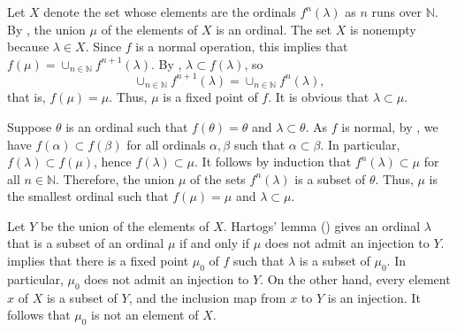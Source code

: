 \documentclass{article}
\begin{document}
\begin{solution}[\ref{exe:vxxp03js}]
  \label{sol:kcmslkfv}
  Let \(X\) denote the set whose elements are the ordinals
  \(f^n(\lambda)\) as \(n\) runs over \(\mathbb{N}\).  By
  , the union \(\mu\) of the elements of \(X\) is
  an ordinal.  The set \(X\) is nonempty because \(\lambda \in X\).
  Since \(f\) is a normal operation, this implies that
  \(f(\mu) = \cup_{n \in \mathbb{N}} f^{n+1}(\lambda)\).  By
  , \(\lambda \subset f(\lambda)\), so
  \begin{displaymath}
    \cup_{n \in \mathbb{N}} f^{n+1}(\lambda) =
    \cup_{n \in \mathbb{N}} f^n(\lambda),
  \end{displaymath}
  that is, \(f(\mu) = \mu\).  Thus, \(\mu\) is a fixed point of \(f\).
  It is obvious that \(\lambda \subset \mu\).

  Suppose \(\theta\) is an ordinal such that \(f(\theta) = \theta\)
  and \(\lambda \subset \theta\).  As \(f\) is normal, by
  , we have
  \(f(\alpha) \subset f(\beta)\) for all ordinals \(\alpha, \beta\)
  such that \(\alpha \subset \beta\).  In particular,
  \(f(\lambda) \subset f(\mu)\), hence \(f(\lambda) \subset \mu\).  It
  follows by induction that \(f^n(\lambda) \subset \mu\) for all
  \(n \in \mathbb{N}\).  Therefore, the union \(\mu\) of the sets
  \(f^n(\lambda)\) is a subset of \(\theta\).  Thus, \(\mu\) is the
  smallest ordinal such that \(f(\mu) = \mu\) and
  \(\lambda \subset \mu\).
\end{solution}

\begin{solution}[\ref{exe:vag0ubn5}]
  \label{sol:k2pgf02q}
  Let \(Y\) be the union of the elements of \(X\).  Hartogs' lemma
  () gives an ordinal \(\lambda\) that is a subset
  of an ordinal \(\mu\) if and only if \(\mu\) does not admit an
  injection to \(Y\).   implies that there is a
  fixed point \(\mu_0\) of \(f\) such that \(\lambda\) is a subset of
  \(\mu_0\).  In particular, \(\mu_0\) does not admit an injection to
  \(Y\).  On the other hand, every element \(x\) of \(X\) is a subset
  of \(Y\), and the inclusion map from \(x\) to \(Y\) is an injection.
  It follows that \(\mu_0\) is not an element of \(X\).
\end{solution}
\end{document}
